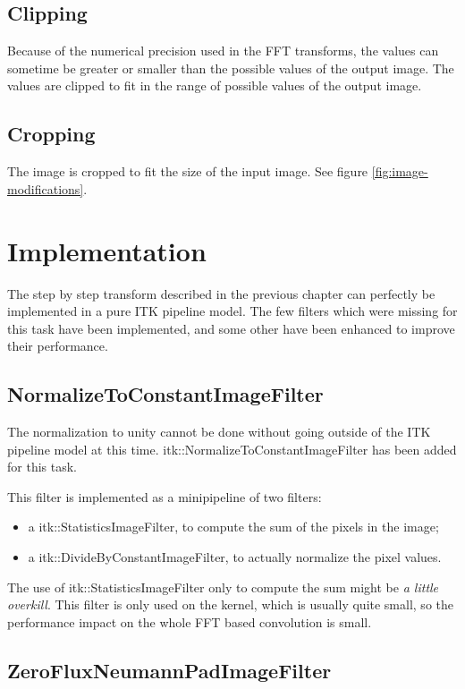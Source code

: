\documentclass{InsightArticle}
\begin{document}
\subsection{Clipping}

Because of the numerical precision used in the FFT transforms, the values can sometime be greater or
smaller than the possible values of the output image.
The values are clipped to fit in the range of possible values of the output image.

\subsection{Cropping}

The image is cropped to fit the size of the input image. See figure \ref{fig:image-modifications}.

\section{Implementation}

The step by step transform described in the previous chapter can perfectly be implemented in a pure
ITK pipeline model. The few filters which were missing for this task have been implemented, and some
other have been enhanced to improve their performance.

\subsection{NormalizeToConstantImageFilter}

The normalization to unity cannot be done without going outside of the ITK pipeline model at this time.
itk::NormalizeToConstantImageFilter has been added for this task.

This filter is implemented as a minipipeline of two filters:
\begin{itemize}
  \item a itk::StatisticsImageFilter, to compute the sum of the pixels in the image;
  \item a itk::DivideByConstantImageFilter, to actually normalize the pixel values.
\end{itemize}
The use of itk::StatisticsImageFilter only to compute the sum might be {\em a little overkill}. This filter
is only used on the kernel, which is usually quite small, so the performance impact on the whole
FFT based convolution is small.

\subsection{ZeroFluxNeumannPadImageFilter}
\end{document}

